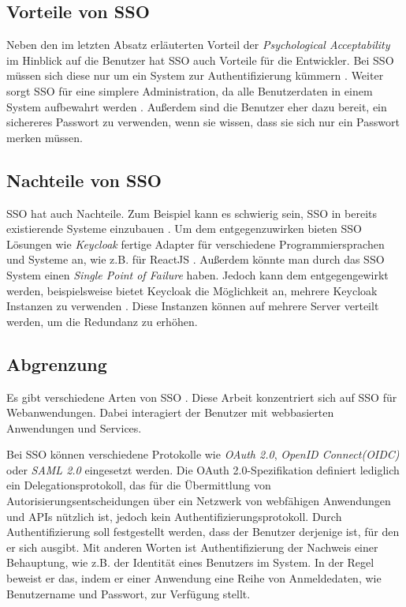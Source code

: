 \subsection{Vorteile von SSO}


Neben den im letzten Absatz erläuterten Vorteil der \textit{Psychological Acceptability} im Hinblick auf die Benutzer hat SSO auch Vorteile für die Entwickler. Bei SSO müssen sich diese nur um ein System zur Authentifizierung kümmern \cite{EB34}. Weiter sorgt SSO für eine simplere Administration, da alle Benutzerdaten in einem System aufbewahrt werden \cite{EB34}. Außerdem sind die Benutzer eher dazu bereit, ein sichereres Passwort zu verwenden, wenn sie wissen, dass sie sich nur ein Passwort merken müssen.

\subsection{Nachteile von SSO}

SSO hat auch Nachteile. Zum Beispiel kann es schwierig sein, SSO in bereits existierende Systeme einzubauen \cite{EB34}. Um dem entgegenzuwirken bieten SSO Lösungen wie \textit{Keycloak} fertige Adapter für verschiedene Programmiersprachen und Systeme an, wie z.B. für ReactJS \cite[OpenID Connect]{EB26} \cite{EB36}. Außerdem könnte man durch das SSO System einen \textit{Single Point of Failure} haben. Jedoch kann dem entgegengewirkt werden, beispielsweise bietet Keycloak die Möglichkeit an, mehrere Keycloak Instanzen zu verwenden \cite{EB33}. Diese Instanzen können auf mehrere Server verteilt werden, um die Redundanz zu erhöhen.

\subsection{Abgrenzung} \label{EB_Abgrenzung}

Es gibt verschiedene Arten von SSO \cite{EB38}. Diese Arbeit konzentriert sich auf SSO für Webanwendungen. Dabei interagiert der Benutzer mit webbasierten Anwendungen und Services.

Bei SSO können verschiedene Protokolle wie \textit{OAuth 2.0}, \textit{OpenID Connect(OIDC)} oder \textit{SAML 2.0} eingesetzt werden. Die OAuth 2.0-Spezifikation definiert lediglich ein Delegationsprotokoll, das für die Übermittlung von Autorisierungsentscheidungen über ein Netzwerk von webfähigen Anwendungen und APIs nützlich ist, jedoch kein Authentifizierungsprotokoll. Durch Authentifizierung soll festgestellt werden, dass der Benutzer derjenige ist, für den er sich ausgibt. Mit anderen Worten ist Authentifizierung der Nachweis einer Behauptung, wie z.B. der Identität eines Benutzers im System. In der Regel beweist er das, indem er einer Anwendung eine Reihe von Anmeldedaten, wie Benutzername und Passwort, zur Verfügung stellt. \cite{SSEB_OAuth2inAction} \label{SSEB_OAuthForAuthentication}

